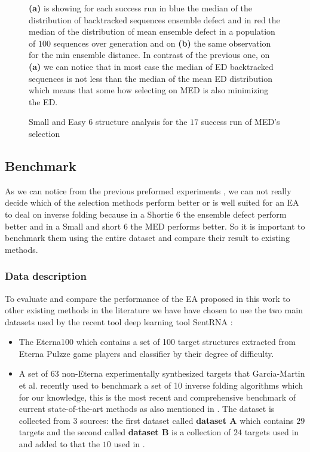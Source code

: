 \documentclass[english,12pt,a4paper]{article}
\theoremstyle{definition}
\begin{document}
\begin{figure}[H]
	\caption{Small and Easy 6 structure analysis for the $17$ success run of  MED's selection}\label{Fig:SUM1-SE6}
	\medskip
	\small
	\textbf{(a)} is showing for each success run in blue the median of the distribution of backtracked sequences ensemble defect and in red the median of the distribution of mean ensemble defect in a population of $100$  sequences over generation and on  \textbf{(b)} the same observation for the min ensemble distance. In contrast of the previous one, on \textbf{(a)} we can notice that in most case the median of ED backtracked  sequences is not less than the median of the mean ED distribution which means that some how selecting on MED is also minimizing the ED.
	
	
\end{figure}
\newpage
\subsection{Benchmark}
As we can notice from the previous preformed  experiments , we can not really decide which of the selection methods perform better or is well suited for an EA to deal on inverse folding because in a Shortie 6 the ensemble defect perform better and in a Small and short 6 the MED performs better. So it is important to benchmark them using the entire dataset and compare their result to existing methods. 

\subsubsection{Data description} 
To evaluate and compare the performance of the EA proposed in this work to other existing methods in the literature we have have chosen to use the two main datasets used by the recent tool deep learning tool SentRNA \cite{shi2018sentrna}:

\begin{itemize}
	\item The Eterna100 which contains a set of 100 target structures extracted from Eterna Pulzze game players and classifier by their degree of difficulty. 
	
	\item A set of 63 non-Eterna experimentally synthesized targets that Garcia-Martin et al. recently used to benchmark a set of 10 inverse folding algorithms which for  our knowledge, this is the most recent and comprehensive benchmark of current state-of-the-art methods as also mentioned in \cite{shi2018sentrna}. The dataset is collected from $3$ sources:  the first dataset called \textbf{dataset A} which contains $29$ targets \cite{esmaili2015erd} \cite{taneda2011modena} and the second called \textbf{dataset B} is a collection of $24$ targets used in \cite{esmaili2015erd}  and added to that the $10$ used in \cite{shi2018sentrna}.
	
\end{itemize}
\end{document}
